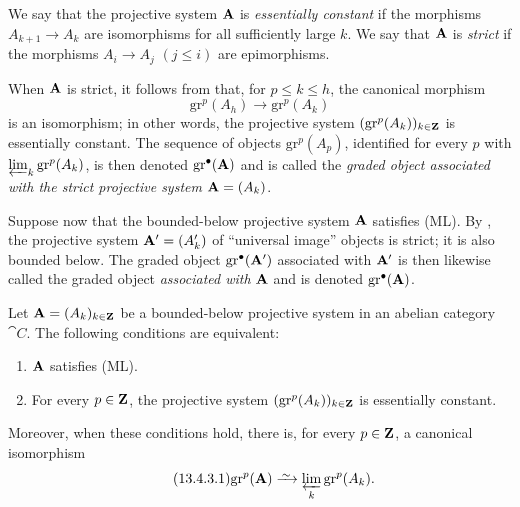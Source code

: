 \begin{env}[13.4.2]
\label{0.13.4.2}
We say that the projective system $\mathbf{A}$ is
\emph{essentially constant} if the morphisms
$A_{k+1}\longrightarrow A_k$ are isomorphisms for all sufficiently
large $k$.
We say that $\mathbf{A}$ is \emph{strict} if the morphisms
$A_i\longrightarrow A_j$ $(j\leq i)$ are epimorphisms.

When $\mathbf{A}$ is strict, it follows from  that, for
$p\leq k\leq h$, the canonical morphism
\[
  \mathrm{gr}^p(A_h)\longrightarrow\mathrm{gr}^p(A_k)
\]
is an isomorphism; in other words, the projective system
$(\mathrm{gr}^p(A_k))_{k\in\mathbf{Z}}$ is essentially constant.
The sequence of objects $\mathrm{gr}^p(A_p)$, identified for every
$p$ with $\varprojlim_k\mathrm{gr}^p(A_k)$, is then denoted
$\mathrm{gr}^\bullet(\mathbf{A})$ and is called the
\emph{graded object associated with the strict projective system}
$\mathbf{A}=(A_k)$.

Suppose now that the bounded-below projective system $\mathbf{A}$
satisfies (ML).
By , the projective system
$\mathbf{A}'=(A'_k)$ of ``universal image'' objects is strict; it is also
bounded below.
The graded object $\mathrm{gr}^\bullet(\mathbf{A}')$ associated with
$\mathbf{A}'$ is then likewise called the graded object
\emph{associated with} $\mathbf{A}$ and is denoted
$\mathrm{gr}^\bullet(\mathbf{A})$.
\end{env}

\begin{proposition}[13.4.3]
\label{0.13.4.3}
Let $\mathbf{A}=(A_k)_{k\in\mathbf{Z}}$ be a bounded-below projective system
in an abelian category $\cat{C}$.
The following conditions are equivalent:
\begin{enumerate}
  \item[{\rm a)}] $\mathbf{A}$ satisfies (ML).
  \item[{\rm b)}] For every $p\in\mathbf{Z}$, the projective system
  $(\mathrm{gr}^p(A_k))_{k\in\mathbf{Z}}$ is essentially constant.
\end{enumerate}
Moreover, when these conditions hold, there is, for every
$p\in\mathbf{Z}$, a canonical isomorphism
\begin{equation}
\label{0.13.4.3.1}
\tag{13.4.3.1}
  \mathrm{gr}^p(\bb{A})
  \isoto
  \varprojlim_k\mathrm{gr}^p(A_k).
\end{equation}
\end{proposition}

